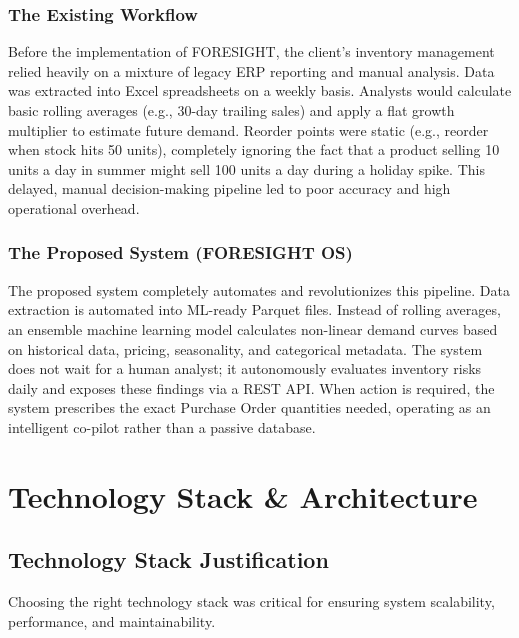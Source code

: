 \documentclass[12pt,a4paper]{report}
\begin{document}
\subsection{The Existing Workflow}
Before the implementation of FORESIGHT, the client's inventory management relied heavily on a mixture of legacy ERP reporting and manual analysis. Data was extracted into Excel spreadsheets on a weekly basis. Analysts would calculate basic rolling averages (e.g., 30-day trailing sales) and apply a flat growth multiplier to estimate future demand. Reorder points were static (e.g., reorder when stock hits 50 units), completely ignoring the fact that a product selling 10 units a day in summer might sell 100 units a day during a holiday spike. This delayed, manual decision-making pipeline led to poor accuracy and high operational overhead.

\subsection{The Proposed System (FORESIGHT OS)}
The proposed system completely automates and revolutionizes this pipeline. Data extraction is automated into ML-ready Parquet files. Instead of rolling averages, an ensemble machine learning model calculates non-linear demand curves based on historical data, pricing, seasonality, and categorical metadata. The system does not wait for a human analyst; it autonomously evaluates inventory risks daily and exposes these findings via a REST API. When action is required, the system prescribes the exact Purchase Order quantities needed, operating as an intelligent co-pilot rather than a passive database.

\chapter{Technology Stack \& Architecture}

\section{Technology Stack Justification}
Choosing the right technology stack was critical for ensuring system scalability, performance, and maintainability.
\end{document}
